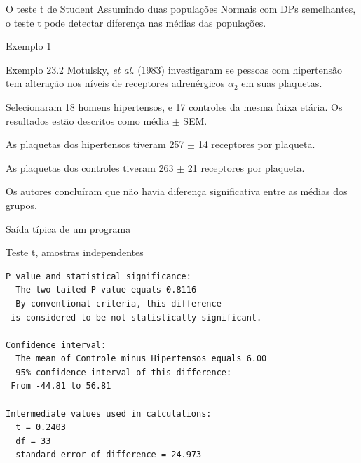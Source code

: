 \documentclass{beamer}
\begin{document}
\begin{frame}{}
  \begin{block}{O teste t de Student}
      Assumindo duas populações Normais com DPs semelhantes, o teste t pode detectar diferença nas médias das populações.
  \end{block}
\end{frame}

\begin{frame}{Exemplo 1}
  \begin{exampleblock}{Exemplo 23.2}
    \small
    Motulsky, {\em et al.} (1983) investigaram se pessoas com hipertensão tem alteração nos níveis de receptores adrenérgicos $\alpha_2$ em suas plaquetas.

    \bigskip
    {\footnotesize
      Selecionaram 18 homens hipertensos, e 17 controles da mesma faixa etária.
      Os resultados estão descritos como média $\pm$ SEM.
    }

    \begin{exampleblock}{}
      \footnotesize
      As plaquetas dos hipertensos tiveram 257 $\pm$ 14 receptores por plaqueta.

      As plaquetas dos controles tiveram 263 $\pm$ 21 receptores por plaqueta.
    \end{exampleblock}
    \bigskip
    Os autores concluíram que não havia diferença significativa entre as médias dos grupos.
  \end{exampleblock}
\end{frame}

\begin{frame}[fragile]{Saída típica de um programa}
  \begin{exampleblock}{Teste t, amostras independentes}
    \footnotesize
\begin{verbatim}
P value and statistical significance: 
  The two-tailed P value equals 0.8116 
  By conventional criteria, this difference
 is considered to be not statistically significant. 

Confidence interval: 
  The mean of Controle minus Hipertensos equals 6.00 
  95% confidence interval of this difference:
 From -44.81 to 56.81 

Intermediate values used in calculations: 
  t = 0.2403 
  df = 33 
  standard error of difference = 24.973 
\end{verbatim}
  \end{exampleblock}
\end{frame}

\end{document}
